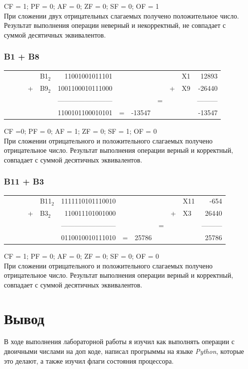 \documentclass[11pt]{article}
\begin{document}
CF = 1; PF = 0; AF = 0; ZF = 0; SF = 0; OF = 1\\
При сложении двух отрицательных слагаемых получено положительное число. Результат выполнения операции неверный и некорректный, не совпадает с суммой десятичных эквивалентов.

\subsubsection{B1 + B8}
\label{sec:org1acdaae}
\setlength{\tabcolsep}{3pt}
\label{tab:orgcda4d71}
\begin{tabular}{lllllrlllllr}
 &  &  &  & B1\(_{\text{2}}\) & 11001001011101 &  &  &  &  & X1 & 12893\\
 &  &  & + & B9\(_{\text{2}}\) & 1001100010111000 &  &  &  & + & X9 & -26440\\
 &  &  &  &  & ------------------------ &  &  & = &  &  & ---------\\
 &  &  &  &  & 1100101100010101 & = & -13547 &  &  &  & -13547\\
\end{tabular}

CF =0; PF = 0; AF = 1; ZF = 0; SF = 1; OF = 0\\
При сложении отрицательного и положительного слагаемых получено отрицательное число. Результат выполнения операции верный и корректный, совпадает с суммой десятичных эквивалентов.

\subsubsection{B11 + B3}
\label{sec:org1bb0e74}
\setlength{\tabcolsep}{3pt}
\label{tab:orgfed2912}
\begin{tabular}{lllllrlllllr}
 &  &  &  & B11\(_{\text{2}}\) & 1111110101110010 &  &  &  &  & X11 & -654\\
 &  &  & + & B3\(_{\text{2}}\) & 110011101001000 &  &  &  & + & X3 & 26440\\
 &  &  &  &  & ------------------------ &  &  & = &  &  & ---------\\
 &  &  &  &  & 0110010010111010 & = & 25786 &  &  &  & 25786\\
\end{tabular}

CF = 1; PF = 0; AF = 0; ZF = 0; SF = 0; OF = 0\\
При сложении отрицательного и положительного слагаемых получено отрицательное число. Результат выполнения операции верный и корректный, совпадает с суммой десятичных эквивалентов.

\section{Вывод}
\label{sec:orge245702}
В ходе выполнения лабораторной работы я изучил как выполнять операции с двоичными числами на доп коде, написал прогрыммы на языке \emph{Python}, которые это делают, а также изучил флаги состояния процессора.
\end{document}
